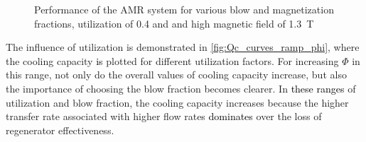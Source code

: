 \documentclass[referee]{svjour3}
\begin{document}
\begin{figure}[!ht]
  \centering
\quad
  \caption{Performance of the AMR system for various blow and magnetization fractions, utilization of 0.4 and and high magnetic field of \SI{1.3}{\tesla}}
  \label{fig:Qc_COP_curves_phi40}
\end{figure}

The influence of utilization is demonstrated in \autoref{fig:Qc_curves_ramp_phi}, where the cooling capacity \textcolor{black}{is} plotted for different utilization factors. For increasing $\Phi$ in this range, not only do the overall values of cooling capacity increase, but also the importance of choosing the blow fraction becomes clearer. In \textcolor{black}{these ranges} of utilization and blow fraction,  the cooling capacity increases because the higher transfer rate associated with higher flow rates \textcolor{black}{dominates} over the loss of regenerator effectiveness.
\end{document}
